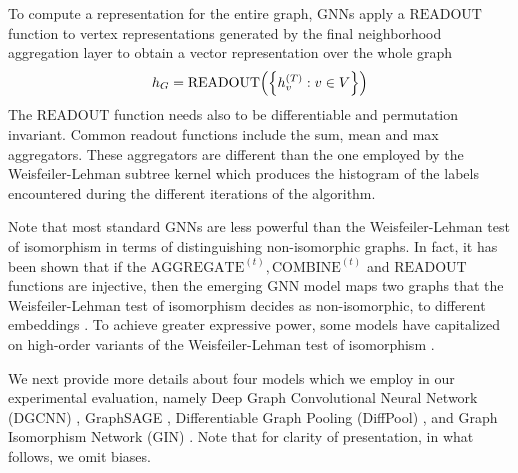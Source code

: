 \documentclass[twoside,11pt]{article}
\begin{document}
To compute a representation for the entire graph, GNNs apply a $\text{READOUT}$ function to vertex representations generated by the final neighborhood aggregation layer to obtain a vector representation over the whole graph
\begin{equation}
    h_G = \text{READOUT} \Bigl( \Bigl\{ h_v^{(T)} :  v \in V \Bigr\} \Bigr)
    \label{eq:readout}
\end{equation}
The $\text{READOUT}$ function needs also to be differentiable and permutation invariant.
Common readout functions include the sum, mean and max aggregators.
These aggregators are different than the one employed by the Weisfeiler-Lehman subtree kernel which produces the histogram of the labels encountered during the different iterations of the algorithm.

Note that most standard GNNs are less powerful than the Weisfeiler-Lehman test of isomorphism in terms of distinguishing non-isomorphic graphs.
In fact, it has been shown that if the $\text{AGGREGATE}^{(t)}, \text{COMBINE}^{(t)}$ and $\text{READOUT}$ functions are injective, then the emerging GNN model maps two graphs that the Weisfeiler-Lehman test of isomorphism decides as non-isomorphic, to different embeddings .
To achieve greater expressive power, some models have capitalized on high-order variants of the Weisfeiler-Lehman test of isomorphism .

We next provide more details about four models which we employ in our experimental evaluation, namely Deep Graph Convolutional Neural Network (DGCNN) , GraphSAGE , Differentiable Graph Pooling (DiffPool) , and Graph Isomorphism Network (GIN) .
Note that for clarity of presentation, in what follows, we omit biases.
\end{document}
